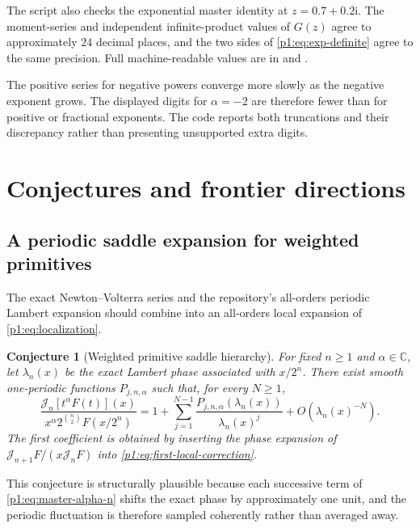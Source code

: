 \documentclass[11pt,oneside]{article}
\newtheorem{conjecture}[theorem]{Conjecture}
\theoremstyle{definition}
\theoremstyle{remark}
\newcommand{\C}{\mathbb C}
\newcommand{\ii}{\mathrm i}
\newcommand{\Jn}{\mathcal J}
\newcommand{\1}{\mathbf 1}
\begin{document}
The script also checks the exponential master identity at
\(z=0.7+0.2\ii\).  The moment-series and independent infinite-product values
of \(G(z)\) agree to approximately \(24\) decimal places, and the two sides of
\eqref{p1:eq:exp-definite} agree to the same precision.  Full machine-readable
values are in  and
.

\begin{warningbox}
The positive series for negative powers converge more slowly as the negative
exponent grows.  The displayed digits for \(\alpha=-2\) are therefore fewer
than for positive or fractional exponents.  The code reports both truncations
and their discrepancy rather than presenting unsupported extra digits.
\end{warningbox}

\section{Conjectures and frontier directions}
\label{p1:sec:conjectures}

\subsection{A periodic saddle expansion for weighted primitives}
The exact Newton--Volterra series and the repository's all-orders periodic
Lambert expansion should combine into an all-orders local expansion of
\eqref{p1:eq:localization}.

\begin{conjecture}[Weighted primitive saddle hierarchy]\label{p1:conj:weighted-saddle}
For fixed \(n\geq1\) and \(\alpha\in\C\), let \(\lambda_n(x)\) be the exact
Lambert phase associated with \(x/2^n\).  There exist smooth one-periodic
functions \(P_{j,n,\alpha}\) such that, for every \(N\geq1\),
\begin{equation}
 \frac{\Jn_n[t^\alpha F(t)](x)}
 {x^\alpha2^{\binom n2}F(x/2^n)}
 =1+\sum_{j=1}^{N-1}
 \frac{P_{j,n,\alpha}(\lambda_n(x))}{\lambda_n(x)^j}
 +O(\lambda_n(x)^{-N}).                                       \label{p1:eq:conj-weighted-saddle}
\end{equation}
The first coefficient is obtained by inserting the phase expansion of
\(\Jn_{n+1}F/(x\Jn_nF)\) into \eqref{p1:eq:first-local-correction}.
\end{conjecture}

This conjecture is structurally plausible because each successive term of
\eqref{p1:eq:master-alpha-n} shifts the exact phase by approximately one unit,
and the periodic fluctuation is therefore sampled coherently rather than
averaged away.
\end{document}
